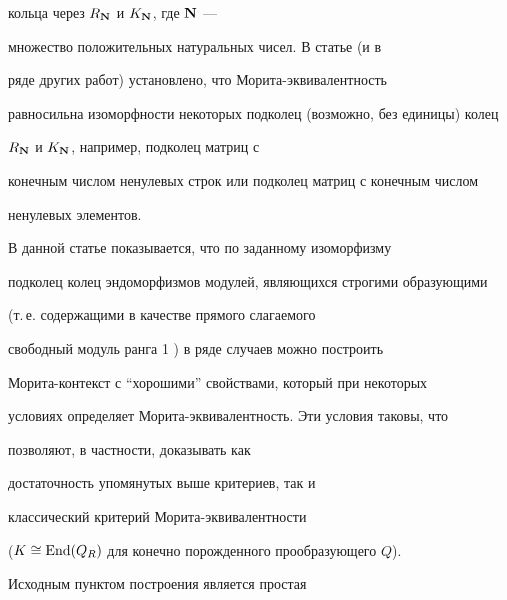 кольца через $ R_{\bold N}$ и $K_{\bold N}$, где ${\bold N}$ ---


множество положительных натуральных чисел. В статье \cite{Abr} (и в


ряде других работ) установлено, что Морита-эквивалентность


равносильна изоморфности некоторых подколец (возможно, без единицы) колец


$R_{\bold N}$ и $K_{\bold N}$, например, подколец матриц с


конечным числом ненулевых строк или подколец матриц с конечным числом


ненулевых элементов.





В данной статье показывается, что по заданному изоморфизму


подколец колец эндоморфизмов модулей, являющихся строгими образующими


(т.\,е. содержащими в качестве прямого слагаемого


свободный модуль ранга 1 \cite{Mih} ) в ряде случаев можно построить


Морита-контекст с ``хорошими'' свойствами, который при некоторых


условиях определяет Морита-эквивалентность. Эти условия таковы, что


позволяют, в частности, доказывать как


достаточность упомянутых выше критериев, так и


классический критерий Морита-эквивалентности


($K \cong\operatorname{End}(Q_R)$ для конечно порожденного прообразующего $Q$).


Исходным пунктом построения является простая





